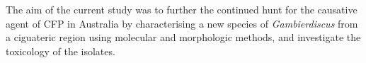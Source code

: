 \documentclass[12pt]{article}
\begin{document}
The aim of the current study was to further the continued hunt for the causative agent of CFP in Australia by characterising a new species of \emph{Gambierdiscus} from a ciguateric region using molecular and morphologic methods, and investigate the toxicology of the isolates.






\end{document}
